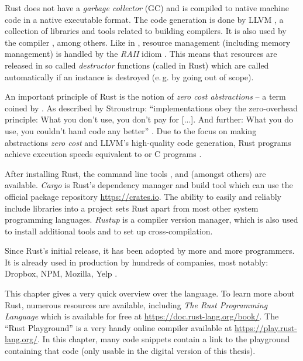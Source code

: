 Rust does not have a \emph{garbage collector} (GC) and is compiled to native machine code in a native executable format.
The code generation is done by LLVM \cite{llvmwebsite, lattner2004llvm}, a collection of libraries and tools related to building compilers.
It is also used by the \cpp compiler , among others.
Like in \cpp, resource management (including memory management) is handled by the \emph{RAII} idiom \cite{raiihackcraft, stroustrup2001exception}.
This means that resources are released in so called \emph{destructor} functions (called  in Rust) which are called automatically if an instance is destroyed (e.\,g. by going out of scope).

An important principle of Rust is the notion of \emph{zero cost abstractions} -- a term coined by \cpp.
As described by Stroustrup: \enquote{\cpp implementations obey the zero-overhead principle: What you don’t use, you don’t pay for [...]. And further: What you do use, you couldn’t hand code any better} \cite{stroustrup2012foundations}.
Due to the focus on making abstractions \emph{zero cost} and LLVM's high-quality code generation, Rust programs achieve execution speeds equivalent to \cpp or C programs \cite{benchmarkgame}.

After installing Rust, the command line tools ,  and  (amongst others) are available.
\emph{Cargo} is Rust's dependency manager and build tool which can use the official package repository \url{https://crates.io}.
The ability to easily and reliably include libraries into a project sets Rust apart from most other system programming languages.
\emph{Rustup} is a compiler version manager, which is also used to install additional tools and to set up cross-compilation.

Since Rust's initial release, it has been adopted by more and more programmers.
It is already used in production by hundreds of companies, most notably: Dropbox, NPM, Mozilla, Yelp \cite{rust-production}.

This chapter gives a very quick overview over the language.
To learn more about Rust, numerous resources are available, including \emph{The Rust Programming Language} \cite{klabnik2018rust} which is available for free at \url{https://doc.rust-lang.org/book/}.
The \enquote{Rust Playground} is a very handy online compiler available at \url{https://play.rust-lang.org/}.
In this chapter, many code snippets contain a link to the playground containing that code (only usable in the digital version of this thesis).

